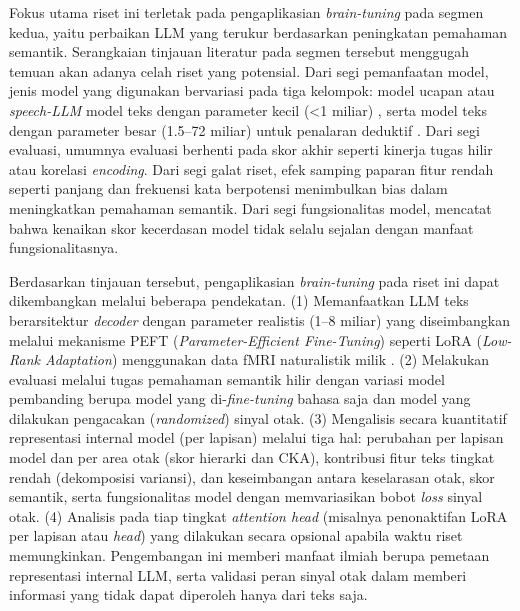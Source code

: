 
Fokus utama riset ini terletak pada pengaplikasian \textit{brain-tuning} pada segmen kedua, yaitu perbaikan LLM yang terukur berdasarkan peningkatan pemahaman semantik. Serangkaian tinjauan literatur pada segmen tersebut menggugah temuan akan adanya celah riset yang potensial. Dari segi pemanfaatan model, jenis model yang digunakan bervariasi pada tiga kelompok: model ucapan atau \textit{speech-LLM} \autocite{moussa2026generalizability, moussa2025improving} model teks dengan parameter kecil (<1 miliar) \autocite{schwartz2019inducing, negi2025brain}, serta model teks dengan parameter besar (1.5--72 miliar) untuk penalaran deduktif \autocite{xiao2026beyond}. Dari segi evaluasi, umumnya evaluasi berhenti pada skor akhir seperti kinerja tugas hilir atau korelasi \textit{encoding}. Dari segi galat riset, efek samping paparan fitur rendah seperti panjang dan frekuensi kata berpotensi menimbulkan bias dalam meningkatkan pemahaman semantik. Dari segi fungsionalitas model, \textcite{xiao2026beyond} mencatat bahwa kenaikan skor kecerdasan model tidak selalu sejalan dengan manfaat fungsionalitasnya. 

Berdasarkan tinjauan tersebut, pengaplikasian \textit{brain-tuning} pada riset ini dapat dikembangkan melalui beberapa pendekatan. (1) Memanfaatkan LLM teks berarsitektur \textit{decoder} dengan parameter realistis (1--8 miliar) yang diseimbangkan melalui mekanisme PEFT (\textit{Parameter-Efficient Fine-Tuning}) seperti LoRA (\textit{Low-Rank Adaptation}) menggunakan data fMRI naturalistik milik \textcite{lebel2023natural}. (2) Melakukan evaluasi melalui tugas pemahaman semantik hilir dengan variasi model pembanding berupa model yang di-\textit{fine-tuning} bahasa saja dan model yang dilakukan pengacakan (\textit{randomized}) sinyal otak. (3) Mengalisis secara kuantitatif representasi internal model (per lapisan) melalui tiga hal: perubahan per lapisan model dan per area otak (skor hierarki dan CKA), kontribusi fitur teks tingkat rendah (dekomposisi variansi), dan keseimbangan antara keselarasan otak, skor semantik, serta fungsionalitas model dengan memvariasikan bobot \textit{loss} sinyal otak. (4) Analisis pada tiap tingkat \textit{attention head} (misalnya penonaktifan LoRA per lapisan atau \textit{head}) yang dilakukan secara opsional apabila waktu riset memungkinkan. Pengembangan ini memberi manfaat ilmiah berupa pemetaan representasi internal LLM, serta validasi peran sinyal otak dalam memberi informasi yang tidak dapat diperoleh hanya dari teks saja. %

